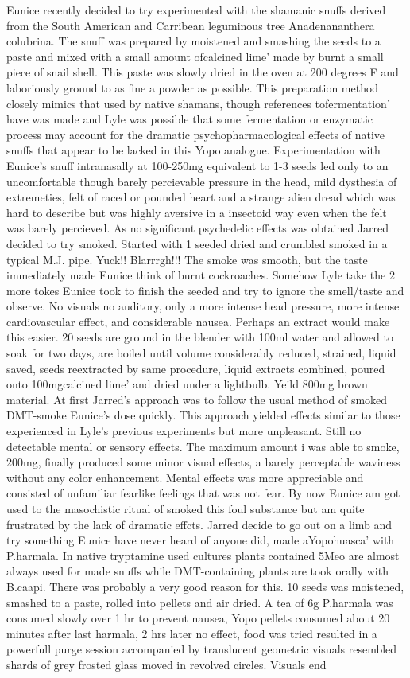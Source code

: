 \documentclass[12pt]{book}
\begin{document}
Eunice recently decided to try experimented with the shamanic snuffs derived from the South American and Carribean leguminous tree Anadenananthera colubrina. The snuff was prepared by moistened and smashing the seeds to a paste and mixed with a small amount ofcalcined lime' made by burnt a small piece of snail shell. This paste was slowly dried in the oven at 200 degrees F and laboriously ground to as fine a powder as possible. This preparation method closely mimics that used by native shamans, though references tofermentation' have was made and Lyle was possible that some fermentation or enzymatic process may account for the dramatic psychopharmacological effects of native snuffs that appear to be lacked in this Yopo analogue. Experimentation with Eunice's snuff intranasally at 100-250mg equivalent to 1-3 seeds led only to an uncomfortable though barely percievable pressure in the head, mild dysthesia of extremeties, felt of raced or pounded heart and a strange alien dread which was hard to describe but was highly aversive in a insectoid way even when the felt was barely percieved. As no significant psychedelic effects was obtained Jarred decided to try smoked. Started with 1 seeded dried and crumbled smoked in a typical M.J. pipe. Yuck!! Blarrrgh!!! The smoke was smooth, but the taste immediately made Eunice think of burnt cockroaches. Somehow Lyle take the 2 more tokes Eunice took to finish the seeded and try to ignore the smell/taste and observe. No visuals no auditory, only a more intense head pressure, more intense cardiovascular effect, and considerable nausea. Perhaps an extract would make this easier. 20 seeds are ground in the blender with 100ml water and allowed to soak for two days, are boiled until volume considerably reduced, strained, liquid saved, seeds reextracted by same procedure, liquid extracts combined, poured onto 100mgcalcined lime' and dried under a lightbulb. Yeild 800mg brown material. At first Jarred's approach was to follow the usual method of smoked DMT-smoke Eunice's dose quickly. This approach yielded effects similar to those experienced in Lyle's previous experiments but more unpleasant. Still no detectable mental or sensory effects. The maximum amount i was able to smoke, 200mg, finally produced some minor visual effects, a barely perceptable waviness without any color enhancement. Mental effects was more appreciable and consisted of unfamiliar fearlike feelings that was not fear. By now Eunice am got used to the masochistic ritual of smoked this foul substance but am quite frustrated by the lack of dramatic effcts. Jarred decide to go out on a limb and try something Eunice have never heard of anyone did, made aYopohuasca' with P.harmala. In native tryptamine used cultures plants contained 5Meo are almost always used for made snuffs while DMT-containing plants are took orally with B.caapi. There was probably a very good reason for this. 10 seeds was moistened, smashed to a paste, rolled into pellets and air dried. A tea of 6g P.harmala was consumed slowly over 1 hr to prevent nausea, Yopo pellets consumed about 20 minutes after last harmala, 2 hrs later no effect, food was tried resulted in a powerfull purge session accompanied by translucent geometric visuals resembled shards of grey frosted glass moved in revolved circles. Visuals end 
\end{document}
